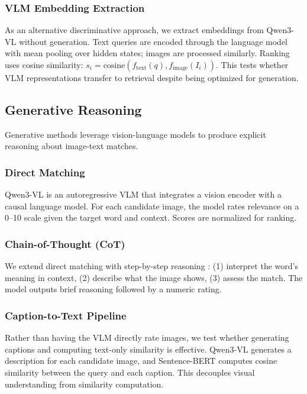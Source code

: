\documentclass[11pt]{article}
\begin{document}
\subsubsection{VLM Embedding Extraction}

As an alternative discriminative approach, we extract embeddings from Qwen3-VL \cite{yang2025qwen3} without generation. Text queries are encoded through the language model with mean pooling over hidden states; images are processed similarly. Ranking uses cosine similarity: $s_i = \text{cosine}(f_{\text{text}}(q), f_{\text{image}}(I_i))$. This tests whether VLM representations transfer to retrieval despite being optimized for generation.

\subsection{Generative Reasoning}

Generative methods leverage vision-language models to produce explicit reasoning about image-text matches.

\subsubsection{Direct Matching}

Qwen3-VL \cite{yang2025qwen3} is an autoregressive VLM that integrates a vision encoder with a causal language model. For each candidate image, the model rates relevance on a 0--10 scale given the target word and context. Scores are normalized for ranking.

\subsubsection{Chain-of-Thought (CoT)}

We extend direct matching with step-by-step reasoning \cite{wei2022chain}: (1) interpret the word's meaning in context, (2) describe what the image shows, (3) assess the match. The model outputs brief reasoning followed by a numeric rating.

\subsubsection{Caption-to-Text Pipeline}

Rather than having the VLM directly rate images, we test whether generating captions and computing text-only similarity is effective. Qwen3-VL generates a description for each candidate image, and Sentence-BERT \cite{reimers2019sentence} computes cosine similarity between the query and each caption. This decouples visual understanding from similarity computation.
\end{document}
